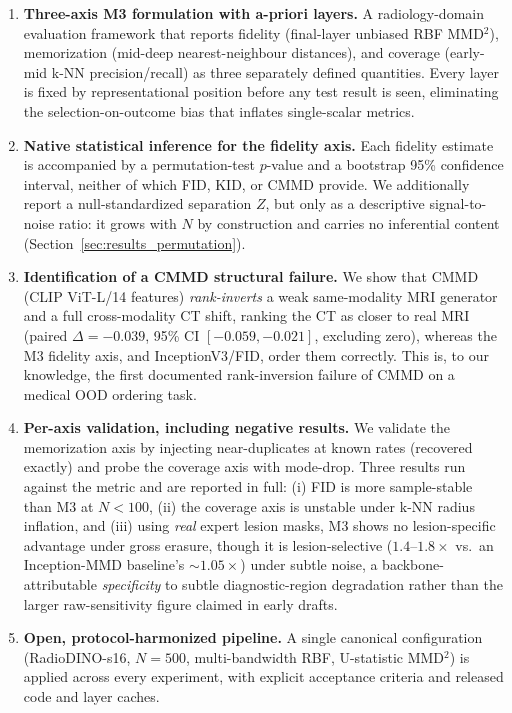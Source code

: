 \documentclass[lettersize,journal]{IEEEtran}
\begin{document}
\begin{enumerate}[leftmargin=*,label=\arabic*.,itemsep=0.3em]

  \item \textbf{Three-axis M3 formulation with a-priori layers.}
        A radiology-domain evaluation framework that reports fidelity (final-layer unbiased RBF MMD\(^2\)), memorization (mid-deep nearest-neighbour distances), and coverage (early-mid k-NN precision/recall) as three separately defined quantities. Every layer is fixed by representational position before any test result is seen, eliminating the selection-on-outcome bias that inflates single-scalar metrics.

  \item \textbf{Native statistical inference for the fidelity axis.}
        Each fidelity estimate is accompanied by a permutation-test $p$-value and a bootstrap 95\% confidence interval, neither of which FID, KID, or CMMD provide. We additionally report a null-standardized separation $Z$, but only as a descriptive signal-to-noise ratio: it grows with $N$ by construction and carries no inferential content (Section~\ref{sec:results_permutation}).

  \item \textbf{Identification of a CMMD structural failure.}
        We show that CMMD (CLIP ViT-L/14 features) \emph{rank-inverts} a weak same-modality MRI generator and a full cross-modality CT shift, ranking the CT as closer to real MRI (paired $\Delta = -0.039$, 95\% CI $[-0.059,-0.021]$, excluding zero), whereas the M3 fidelity axis, and InceptionV3/FID, order them correctly. This is, to our knowledge, the first documented rank-inversion failure of CMMD on a medical OOD ordering task.

  \item \textbf{Per-axis validation, including negative results.}
        We validate the memorization axis by injecting near-duplicates at known rates (recovered exactly) and probe the coverage axis with mode-drop. Three results run against the metric and are reported in full: (i) FID is more sample-stable than M3 at $N < 100$, (ii) the coverage axis is unstable under k-NN radius inflation, and (iii) using \emph{real} expert lesion masks, M3 shows no lesion-specific advantage under gross erasure, though it is lesion-selective ($1.4$--$1.8\times$ vs.\ an Inception-MMD baseline's $\sim$$1.05\times$) under subtle noise, a backbone-attributable \emph{specificity} to subtle diagnostic-region degradation rather than the larger raw-sensitivity figure claimed in early drafts.

  \item \textbf{Open, protocol-harmonized pipeline.}
        A single canonical configuration (RadioDINO-s16, $N = 500$, multi-bandwidth RBF, U-statistic MMD\(^2\)) is applied across every experiment, with explicit acceptance criteria and released code and layer caches.

\end{enumerate}
\end{document}
